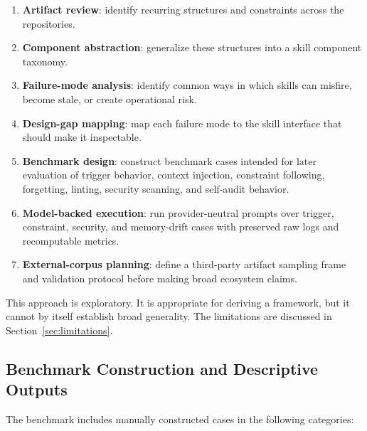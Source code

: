 \documentclass[11pt]{article}
\begin{document}
\begin{enumerate}[leftmargin=*]
    \item \textbf{Artifact review}: identify recurring structures and
    constraints across the repositories.
    \item \textbf{Component abstraction}: generalize these structures into a
    skill component taxonomy.
    \item \textbf{Failure-mode analysis}: identify common ways in which skills
    can misfire, become stale, or create operational risk.
    \item \textbf{Design-gap mapping}: map each failure mode to the skill
    interface that should make it inspectable.
    \item \textbf{Benchmark design}: construct benchmark cases intended for
    later evaluation of trigger behavior, context injection, constraint
    following, forgetting, linting, security scanning, and self-audit
    behavior.
    \item \textbf{Model-backed execution}: run provider-neutral prompts over
    trigger, constraint, security, and memory-drift cases with preserved raw
    logs and recomputable metrics.
    \item \textbf{External-corpus planning}: define a third-party artifact
    sampling frame and validation protocol before making broad ecosystem
    claims.
\end{enumerate}

This approach is exploratory. It is appropriate for deriving a
framework, but it cannot by itself establish broad generality. The limitations
are discussed in Section~\ref{sec:limitations}.

\subsection{Benchmark Construction and Descriptive Outputs}

The benchmark includes manually constructed cases in the following
categories:
\end{document}
